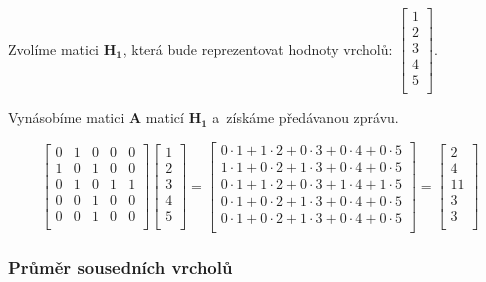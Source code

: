 Zvolíme matici $\mathbf{H_1}$, která bude reprezentovat hodnoty vrcholů:
$\left[ \begin{matrix}
1 \\
2 \\
3 \\
4 \\
5 \\
\end{matrix} \right]$.

Vynásobíme matici $\mathbf{A}$ maticí $\mathbf{H_1}$ a~získáme předávanou zprávu.

$$
\left[ \begin{matrix}
0 & 1 & 0 & 0 & 0 \\
1 & 0 & 1 & 0 & 0 \\
0 & 1 & 0 & 1 & 1 \\
0 & 0 & 1 & 0 & 0 \\
0 & 0 & 1 & 0 & 0 \\
\end{matrix} \right]
\left[ \begin{matrix}
1 \\
2 \\
3 \\
4 \\
5 \\
\end{matrix} \right] = 
\left[ \begin{matrix}
0 \cdot 1 + 1 \cdot 2 + 0 \cdot 3 + 0 \cdot 4 + 0 \cdot 5 \\
1 \cdot 1 + 0 \cdot 2 + 1 \cdot 3 + 0 \cdot 4 + 0 \cdot 5 \\
0 \cdot 1 + 1 \cdot 2 + 0 \cdot 3 + 1 \cdot 4 + 1 \cdot 5 \\
0 \cdot 1 + 0 \cdot 2 + 1 \cdot 3 + 0 \cdot 4 + 0 \cdot 5 \\
0 \cdot 1 + 0 \cdot 2 + 1 \cdot 3 + 0 \cdot 4 + 0 \cdot 5 \\
\end{matrix} \right] = 
\left[ \begin{matrix}
2 \\
4 \\
11 \\
3 \\
3 \\
\end{matrix} \right]
$$

\subsubsection{Průměr sousedních vrcholů}

